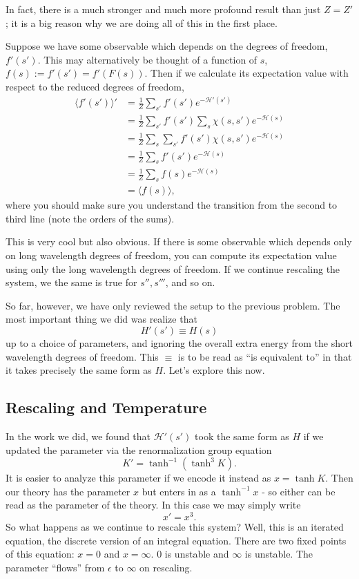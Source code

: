 \documentclass[main.tex]{subfiles}
\begin{document}
In fact, there is a much stronger and much more profound result than just $Z = Z'$; it is a big reason why we are doing all of this in the first place.

Suppose we have some observable which depends on the degrees of freedom, $f'(s')$. This may alternatively be thought of a function of $s$, $f(s) := f'(s') = f'(F(s))$.  Then if we calculate its expectation value with respect to the reduced degrees of freedom,
\begin{align} \label{expval}
\langle f'(s') \rangle'& = \frac{1}{Z} \sum_{s'} f'(s') e^{-\mathcal{H}'(s')} \\& = \frac{1}{Z} \sum_{s'} f'(s') \sum_s \chi(s,s') e^{-\mathcal{H}(s)}  \\ &=
\frac{1}{Z} \sum_{s} \sum_{s'} f'(s') \chi(s,s') e^{-\mathcal{H}(s)}\\ & = \frac{1}{Z} \sum_s f'(s') e^{-\mathcal{H}(s)} \\ & = \frac{1}{Z} \sum_s f(s) e^{-\mathcal{H}(s)} \\ & = \langle f(s) \rangle,
\end{align}
where you should make sure you understand the transition from the second to third line (note the orders of the sums). 

This is very cool but also obvious. If there is some observable which depends only on long wavelength degrees of freedom, you can compute its expectation value using only the long wavelength degrees of freedom. If we continue rescaling the system, we the same is true for $s'',s'''$, and so on.

So far, however, we have only reviewed the setup to the previous problem. The most important thing we did was realize that 
\[
H' (s') \equiv H(s)
\]
up to a choice of parameters, and ignoring the overall extra energy from the short wavelength degrees of freedom. This $\equiv$ is to be read as ``is equivalent to'' in that it takes precisely the same form as $H$. Let's explore this now.

\subsection{Rescaling and Temperature}
In the work we did, we found that $\mathcal{H}'(s')$ took the same form as $H$ if we updated the parameter via the renormalization group equation
\[
K' = \tanh^{-1} (\tanh^3 K).
\]
It is easier to analyze this parameter if we encode it instead as $x = \tanh K$. Then our theory has the parameter $x$ but enters in as a $\tanh^{-1} x$ - so either can be read as the parameter of the theory. In this case we may simply write
\[
x' = x^3.
\]
So what happens as we continue to rescale this system? Well, this is an iterated equation, the discrete version of an integral equation. There are two fixed points of this equation: $x = 0$ and $x = \infty$. $0$ is unstable and $\infty$ is unstable. The parameter ``flows'' from $\epsilon$ to $\infty$ on rescaling.
\end{document}
